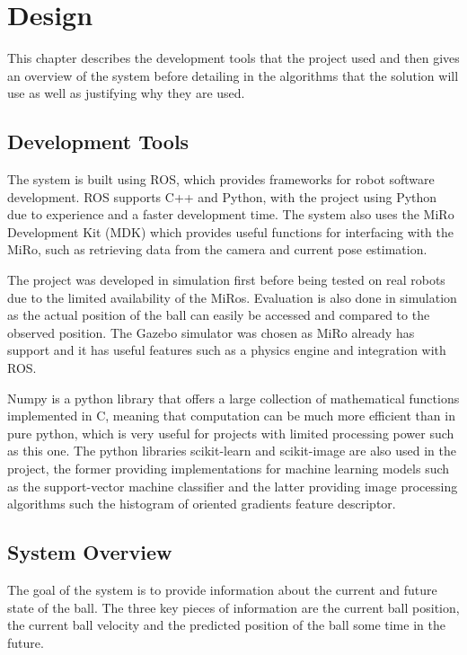 \chapter{Design}
\label{chapter: 4}

This chapter describes the development tools that the project used and then gives an overview of the system before detailing in the algorithms that the solution will use as well as justifying why they are used. 

\section{Development Tools}

The system is built using ROS, which provides frameworks for robot software development. ROS supports C++ and Python, with the project using Python due to experience and a faster development time. The system also uses the MiRo Development Kit (MDK) which provides useful functions for interfacing with the MiRo, such as retrieving data from the camera and current pose estimation.

The project was developed in simulation first before being tested on real robots due to the limited availability of the MiRos. Evaluation is also done in simulation as the actual position of the ball can easily be accessed and compared to the observed position. The Gazebo simulator was chosen as MiRo already has support and it has useful features such as a physics engine and integration with ROS.

Numpy is a python library that offers a large collection of mathematical functions implemented in C, meaning that computation can be much more efficient than in pure python, which is very useful for projects with limited processing power such as this one. The python libraries scikit-learn and scikit-image are also used in the project, the former providing implementations for machine learning models such as the support-vector machine classifier and the latter providing image processing algorithms such the histogram of oriented gradients feature descriptor. 

\section{System Overview}

The goal of the system is to provide information about the current and future state of the ball. The three key pieces of information are the current ball position, the current ball velocity and the predicted position of the ball some time in the future. 

